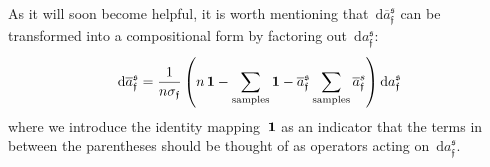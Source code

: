 \documentclass{article}
\begin{document}
\noindent As it will soon become helpful, it is worth mentioning that~$\text{d} \overline{a}_\mathfrak{f}^\mathfrak{s}$ can be transformed into a compositional form by factoring out~$\text{d} a_\mathfrak{f}^\mathfrak{s}$:
\begin{equation}
\text{d} \overline{a}_\mathfrak{f}^\mathfrak{s} = \frac{1}{n\sigma_\mathfrak{f}} \left( n \, {\bf 1} - \sum_\text{samples} {\bf 1} - \overline{a}_\mathfrak{f}^\mathfrak{s} \sum_\text{samples} \overline{a}_\mathfrak{f}^s \right) \text{d} a_\mathfrak{f}^\mathfrak{s}
\label{factorOperator}
\end{equation}
where we introduce the identity mapping~${\bf 1}$ as an indicator that the terms in between the parentheses should be thought of as operators acting on~$\text{d} a_\mathfrak{f}^\mathfrak{s}$.

\newcommand\tempboxBNbackExplain{%
\begin{minipage}{0.2\textwidth}%
\abovedisplayskip=0pt
\belowdisplayskip=0pt
\begin{align*}
\text{d}\overline{\bf A}_{i-1} &= \left(
\begin{matrix}
\text{d} \overline{a}_1^1 & \dots & \text{d} \overline{a}_f^1 \\
\vdots & \vdots & \vdots \\
\text{d} \overline{a}_1^n & \dots & \text{d} \overline{a}_f^n
\end{matrix}
\right) = \left(
\begin{matrix}
\big( n \text{d}a_1^1 - \sum_s \text{d}a_1^s - \overline{a}_1^1 \sum_s \overline{a}_1^s \text{d}a_1^s \big) / n\sigma_1 & \dots & \big( n \text{d}a_f^1 - \sum_s \text{d}a_f^s - \overline{a}_f^1 \sum_s \overline{a}_f^s \text{d}a_f^s \big) / n\sigma_f \\
\vdots & \vdots & \vdots \\
\big( n \text{d}a_1^n - \sum_s \text{d}a_1^s - \overline{a}_1^n \sum_s \overline{a}_1^s \text{d}a_1^s \big) / n\sigma_1 & \dots & \big( n \text{d}a_f^n - \sum_s \text{d}a_f^s - \overline{a}_f^n \sum_s \overline{a}_f^s \text{d}a_f^s \big) / n\sigma_f
\end{matrix}
\right) \\
&= \frac{1}{n} \left[ \left(
\begin{matrix}
n \text{d}a_1^1 & \dots & n \text{d}a_f^1 \\
\vdots & \vdots & \vdots \\
n \text{d}a_1^n & \dots & n \text{d}a_f^n
\end{matrix}
\right) - \left(
\begin{matrix}

\end{matrix}
\end{align*}
\end{minipage}}
\end{document}
